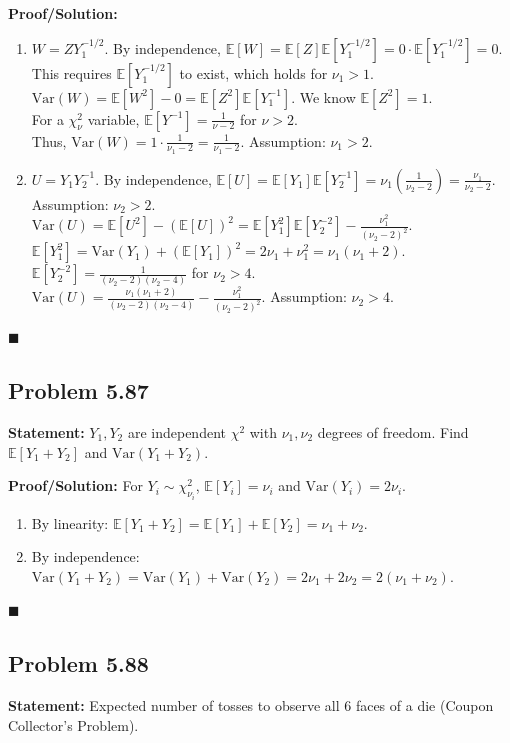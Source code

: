 \documentclass[11pt, a4paper]{article}
\theoremstyle{definition}
\theoremstyle{remark}
\newcommand{\E}{\mathbb{E}}
\newcommand{\Var}{\mathrm{Var}}
\begin{document}
\textbf{Proof/Solution:}
\begin{enumerate}[label=\alph*)]
    \item $W = Z Y_1^{-1/2}$. By independence, $\E[W] = \E[Z]\E[Y_1^{-1/2}] = 0 \cdot \E[Y_1^{-1/2}] = 0$. \\ \relax
    This requires $\E[Y_1^{-1/2}]$ to exist, which holds for $\nu_1 > 1$. \\ \relax
    $\Var(W) = \E[W^2] - 0 = \E[Z^2]\E[Y_1^{-1}]$. We know $\E[Z^2] = 1$. \\ \relax
    For a $\chi^2_\nu$ variable, $\E[Y^{-1}] = \frac{1}{\nu - 2}$ for $\nu > 2$. \\ \relax
    Thus, $\Var(W) = 1 \cdot \frac{1}{\nu_1 - 2} = \frac{1}{\nu_1 - 2}$. Assumption: $\nu_1 > 2$.
    \item $U = Y_1 Y_2^{-1}$. By independence, $\E[U] = \E[Y_1]\E[Y_2^{-1}] = \nu_1 \left( \frac{1}{\nu_2 - 2} \right) = \frac{\nu_1}{\nu_2 - 2}$. Assumption: $\nu_2 > 2$. \\ \relax
    $\Var(U) = \E[U^2] - (\E[U])^2 = \E[Y_1^2]\E[Y_2^{-2}] - \frac{\nu_1^2}{(\nu_2 - 2)^2}$. \\ \relax
    $\E[Y_1^2] = \Var(Y_1) + (\E[Y_1])^2 = 2\nu_1 + \nu_1^2 = \nu_1(\nu_1 + 2)$. \\ \relax
    $\E[Y_2^{-2}] = \frac{1}{(\nu_2 - 2)(\nu_2 - 4)}$ for $\nu_2 > 4$. \\ \relax
    $\Var(U) = \frac{\nu_1(\nu_1 + 2)}{(\nu_2 - 2)(\nu_2 - 4)} - \frac{\nu_1^2}{(\nu_2 - 2)^2}$. Assumption: $\nu_2 > 4$.
\end{enumerate}
\hfill $\blacksquare$

\subsection{Problem 5.87}
\textbf{Statement:} $Y_1, Y_2$ are independent $\chi^2$ with $\nu_1, \nu_2$ degrees of freedom. Find $\E[Y_1 + Y_2]$ and $\Var(Y_1 + Y_2)$.

\textbf{Proof/Solution:}
For $Y_i \sim \chi^2_{\nu_i}$, $\E[Y_i] = \nu_i$ and $\Var(Y_i) = 2\nu_i$.
\begin{enumerate}[label=\alph*)]
    \item By linearity: $\E[Y_1 + Y_2] = \E[Y_1] + \E[Y_2] = \nu_1 + \nu_2$.
    \item By independence: $\Var(Y_1 + Y_2) = \Var(Y_1) + \Var(Y_2) = 2\nu_1 + 2\nu_2 = 2(\nu_1 + \nu_2)$.
\end{enumerate}
\hfill $\blacksquare$

\subsection{Problem 5.88}
\textbf{Statement:} Expected number of tosses to observe all 6 faces of a die (Coupon Collector's Problem).
\end{document}
